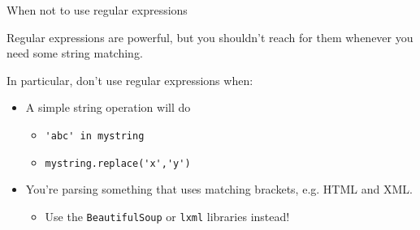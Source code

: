 \documentclass{beamer}
\begin{document}
\begin{frame}{When not to use regular expressions}

Regular expressions are powerful, but you shouldn't reach for them whenever you need some string matching.

\bigskip

In particular, don't use regular expressions when:
\begin{itemize}
 \item A simple string operation will do
	\begin{itemize} 
      \item \lstinline$'abc' in mystring$
      \item \lstinline$mystring.replace('x','y')$
    \end{itemize}
 \item You're parsing something that uses matching brackets, e.g. HTML and XML.
   \begin{itemize}
     \item Use the \lstinline$BeautifulSoup$ or \lstinline$lxml$ libraries instead!
   \end{itemize}
\end{itemize}

\end{frame}
\end{document}
